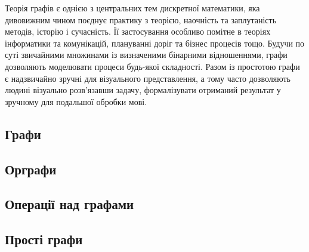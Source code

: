 Теорія графів є однією з центральних тем дискретної математики, яка дивовижним чином поєднує практику з теорією, наочність та заплутаність методів, історію і сучасність. Її застосування особливо помітне в теоріях інформатики та комунікацій, плануванні доріг та бізнес процесів тощо. Будучи по суті звичайними множинами із визначеними бінарними відношеннями, графи дозволяють моделювати процеси будь-якої складності. Разом із простотою графи є надзвичайно зручні для візуального представлення, а тому часто дозволяють людині візуально розв'язавши задачу, формалізувати отриманий результат у зручному для подальшої обробки мові.
\newpage
\subsection{Графи}


\newpage
\subsection{Орграфи}


\newpage
\subsection{Операції над графами}


\newpage
\subsection{Прості графи}

